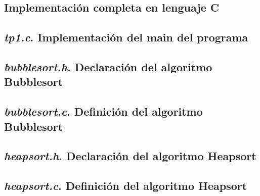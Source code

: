 \documentclass{article}
\begin{document}
\begin{appendices}

\bigskip\bigskip

\section{Implementación completa en lenguaje C}


\subsection{\textit{tp1.c}. Implementación del main del programa}
\lstset{ language = C } %
 
\bigskip\bigskip

\subsection{\textit{bubblesort.h}. Declaración del algoritmo Bubblesort}
\lstset{ language = C } %
 
\bigskip\bigskip

\subsection{\textit{bubblesort.c}. Definición del algoritmo Bubblesort}
\lstset{ language = C } %
 
\bigskip\bigskip

\subsection{\textit{heapsort.h}. Declaración del algoritmo Heapsort}
\lstset{ language = C } %
 
\bigskip\bigskip

\subsection{\textit{heapsort.c}. Definición del algoritmo Heapsort}
\lstset{ language = C } %
 
\bigskip\bigskip


\end{appendices}
\end{document}

